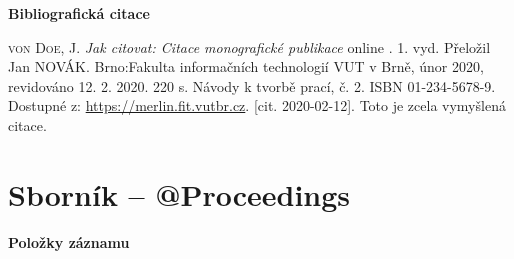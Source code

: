 \bigskip

\noindent \textbf{Bibliografická citace}

\medskip

\noindent \textsc{von Doe}, J. \textit{Jak citovat: Citace monografické publikace} online . 1. vyd. Přeložil Jan NOVÁK.
Brno:Fakulta informačních technologií VUT v Brně, únor 2020, revidováno 12. 2. 2020. 220 s. Návody k tvorbě prací, č. 2. ISBN 01-234-5678-9. Dostupné z: \url{https://merlin.fit.vutbr.cz}. [cit. 2020-02-12]. Toto je zcela vymyšlená citace. 
\newpage
\section*{Sborník -- @Proceedings}
\label{pr-sbornik}
\noindent \textbf{Položky záznamu}

\medskip

